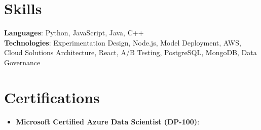 \documentclass[letterpaper,11pt]{article}
\newcommand{\resumeItem}[2]{
  \item\small{
    \textbf{#1}{: #2 \vspace{-2pt}}
  }
}
\newcommand{\resumeSubItem}[2]{\resumeItem{#1}{#2}\vspace{-4pt}}
\newcommand{\resumeSubHeadingListStart}{\begin{itemize}[leftmargin=*]}
\newcommand{\resumeSubHeadingListEnd}{\end{itemize}}
\begin{document}
\section{Skills}
  \begin{itemize}[leftmargin=0.15in, label={}]
    \small{\item{
      \textbf{Languages}{: Python, JavaScript, Java, C++} \\
      \textbf{Technologies}{: Experimentation Design, Node.js, Model Deployment, AWS, Cloud Solutions Architecture, React, A/B Testing, PostgreSQL, MongoDB, Data Governance}
    }}
  \end{itemize}

\section{Certifications}
  \resumeSubHeadingListStart
    \resumeSubItem{Microsoft Certified Azure Data Scientist (DP-100)}{}
  \resumeSubHeadingListEnd
\end{document}
